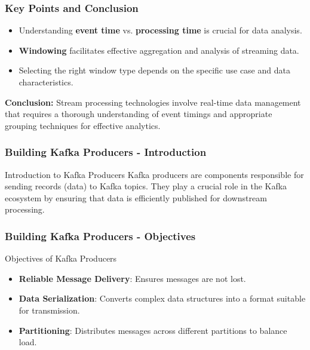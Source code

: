 \documentclass[aspectratio=169]{beamer}
\begin{document}
\begin{frame}[fragile]
    \frametitle{Key Points and Conclusion}
    \begin{itemize}
        \item Understanding \textbf{event time} vs. \textbf{processing time} is crucial for data analysis.
        \item \textbf{Windowing} facilitates effective aggregation and analysis of streaming data.
        \item Selecting the right window type depends on the specific use case and data characteristics.
    \end{itemize}
    \vspace{10pt}
    \textbf{Conclusion:} Stream processing technologies involve real-time data management that requires a thorough understanding of event timings and appropriate grouping techniques for effective analytics.
\end{frame}

\begin{frame}[fragile]
    \frametitle{Building Kafka Producers - Introduction}
    \begin{block}{Introduction to Kafka Producers}
        Kafka producers are components responsible for sending records (data) to Kafka topics. They play a crucial role in the Kafka ecosystem by ensuring that data is efficiently published for downstream processing.
    \end{block}
\end{frame}

\begin{frame}[fragile]
    \frametitle{Building Kafka Producers - Objectives}
    \begin{block}{Objectives of Kafka Producers}
        \begin{itemize}
            \item \textbf{Reliable Message Delivery}: Ensures messages are not lost.
            \item \textbf{Data Serialization}: Converts complex data structures into a format suitable for transmission.
            \item \textbf{Partitioning}: Distributes messages across different partitions to balance load.
        \end{itemize}
    \end{block}
\end{frame}
\end{document}
